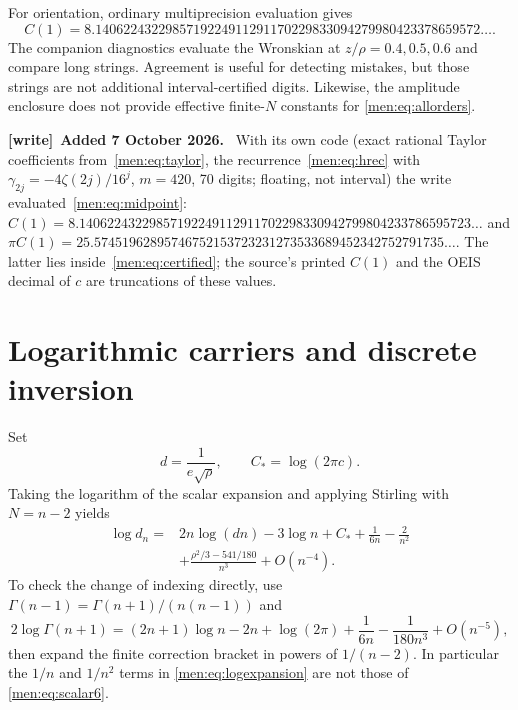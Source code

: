 \documentclass[11pt,letterpaper]{article}
\theoremstyle{remark}\newtheorem{remark}[theorem]{Remark}
\newenvironment{writenote}[1][]{\par\smallskip\begingroup\small
 \noindent\textbf{[write]}\if\relax\detokenize{#1}\relax\else~\textbf{#1.}\fi\ }%
 {\par\endgroup\smallskip}
\begin{document}
For orientation, ordinary multiprecision evaluation gives
\[
 C(1)=8.1406224322985719224911291170229833094279980423378659572\ldots.
\]
The companion diagnostics evaluate the Wronskian at $z/\rho=0.4,0.5,0.6$ and compare long strings. Agreement is useful for detecting mistakes, but those strings are not additional interval-certified digits. Likewise, the amplitude enclosure does not provide effective finite-$N$ constants for \eqref{men:eq:allorders}.

\begin{writenote}[Added 7 October 2026]
With its own code (exact rational Taylor coefficients from~\eqref{men:eq:taylor},
the recurrence~\eqref{men:eq:hrec} with $\gamma_{2j}=-4\zeta(2j)/16^j$, $m=420$,
70 digits; floating, not interval) the write evaluated~\eqref{men:eq:midpoint}:
$C(1)=8.14062243229857192249112911702298330942799804233786595723\ldots$ and
$\pi C(1)=25.57451962895746752153723231273533689452342752791735\ldots$. The
latter lies inside~\eqref{men:eq:certified}; the source's printed $C(1)$ and the
OEIS decimal of $c$ are truncations of these values.
\end{writenote}

\section{Logarithmic carriers and discrete inversion}\label{men:sec:inverse}
Set
\begin{equation}\label{men:eq:inverseconstants}
 d=\frac1{e\sqrt\rho},\qquad C_* =\log(2\pi c).
\end{equation}
Taking the logarithm of the scalar expansion and applying Stirling with $N=n-2$ yields
\begin{equation}\label{men:eq:logexpansion}
 \begin{split}
 \log d_n={}&2n\log(dn)-3\log n+C_*+\frac1{6n}-\frac2{n^2}\\
 &+\frac{\rho^2/3-541/180}{n^3}+O(n^{-4}).
 \end{split}
\end{equation}
To check the change of indexing directly, use
$\Gamma(n-1)=\Gamma(n+1)/(n(n-1))$ and
\[
 2\log\Gamma(n+1)=(2n+1)\log n-2n+\log(2\pi)
                  +\frac1{6n}-\frac1{180n^3}+O(n^{-5}),
\]
then expand the finite correction bracket in powers of $1/(n-2)$. In particular the $1/n$ and $1/n^2$ terms in \eqref{men:eq:logexpansion} are not those of \eqref{men:eq:scalar6}.
\end{document}
